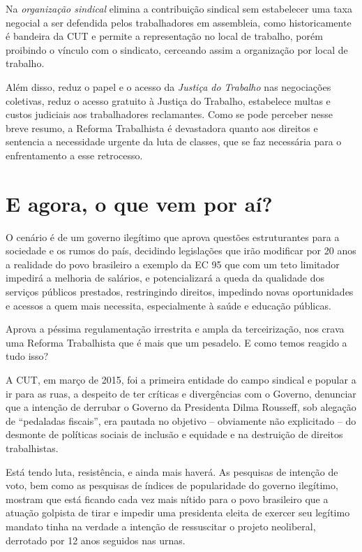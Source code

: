 Na \emph{organização sindical} elimina a contribuição sindical sem
estabelecer uma taxa negocial a ser defendida pelos trabalhadores em
assembleia, como historicamente é bandeira da CUT e permite a
representação no local de trabalho, porém proibindo o vínculo com o
sindicato, cerceando assim a organização por local de trabalho.

Além disso, reduz o papel e o acesso da \emph{Justiça do Trabalho} nas
negociações coletivas, reduz o acesso gratuito à Justiça do Trabalho,
estabelece multas e custos judiciais aos trabalhadores reclamantes. Como
se pode perceber nesse breve resumo, a Reforma Trabalhista é devastadora
quanto aos direitos e sentencia a necessidade urgente da luta de
classes, que se faz necessária para o enfrentamento a esse retrocesso.

\section{E agora, o que vem por aí?}

O cenário é de um governo ilegítimo que aprova questões estruturantes
para a sociedade e os rumos do país, decidindo legislações que irão
modificar por 20 anos a realidade do povo brasileiro a exemplo da EC 95
que com um teto limitador impedirá a melhoria de salários, e
potencializará a queda da qualidade dos serviços públicos prestados,
restringindo direitos, impedindo novas oportunidades e acessos a quem
mais necessita, especialmente à saúde e educação públicas.

Aprova a péssima regulamentação irrestrita e ampla da terceirização, nos
crava uma Reforma Trabalhista que é mais que um pesadelo. E como temos
reagido a tudo isso?

A CUT, em março de 2015, foi a primeira entidade do campo sindical e
popular a ir para as ruas, a despeito de ter críticas e divergências com
o Governo, denunciar que a intenção de derrubar o Governo da Presidenta
Dilma Rousseff, sob alegação de ``pedaladas fiscais'', era pautada no
objetivo -- obviamente não explicitado -- do desmonte de políticas
sociais de inclusão e equidade e na destruição de direitos trabalhistas.

Está tendo luta, resistência, e ainda mais haverá. As pesquisas de
intenção de voto, bem como as pesquisas de índices de popularidade do
governo ilegítimo, mostram que está ficando cada vez mais nítido para o
povo brasileiro que a atuação golpista de tirar e impedir uma presidenta
eleita de exercer seu legítimo mandato tinha na verdade a intenção de
ressuscitar o projeto neoliberal, derrotado por 12 anos seguidos nas
urnas.

